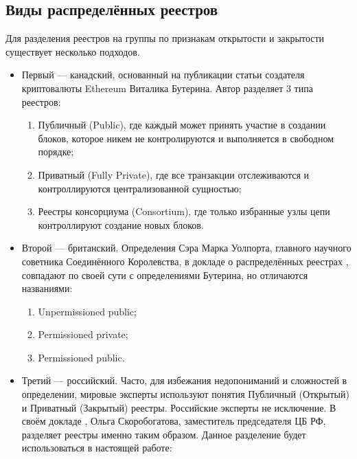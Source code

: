\subsection{Виды распределённых реестров}\label{kinds_reestrs}
Для разделения реестров на группы по признакам открытости и закрытости
существует несколько подходов.
\begin{itemize}
    \item Первый --- канадский, основанный на публикации статьи
        \cite{VitalikButerin2015} создателя криптовалюты Ethereum Виталика
        Бутерина. Автор разделяет 3 типа реестров:
          \begin{enumerate}
              \item Публичный (Public), где каждый может принять участие в
                  создании блоков, которое никем не контролируются и
                  выполняется в свободном порядке;
              \item Приватный (Fully Private), где все транзакции отслеживаются
                  и контроллируются централизованной сущностью;
              \item Реестры консорциума (Consortium), где только избранные узлы
                  цепи контроллируют создание новых блоков.
          \end{enumerate}
     \item Второй --- британский. Определения Сэра Марка Уолпорта, главного
         научного советника Соединённого Королевства, в докладе о
         распределённых реестрах \cite{DeLeon2018}, совпадают по своей сути с определениями
         Бутерина, но отличаются названиями:
         \begin{enumerate}
                 \item Unpermissioned public;
                 \item Permissioned private;
                 \item Permissioned public.
         \end{enumerate}
     \item Третий --- российский. Часто, для избежания недопониманий и
         сложностей в определении, мировые эксперты используют понятия
         Публичный (Открытый) и Приватный (Закрытый) реестры. Российские
         эксперты не исключение. В своём докладе \cite{olga}, Ольга Скоробогатова,
         заместитель председателя ЦБ РФ, разделяет реестры именно таким
         образом. Данное разделение будет использоваться в настоящей работе:
         \begin{enumerate}

\end{enumerate}
\end{itemize}
